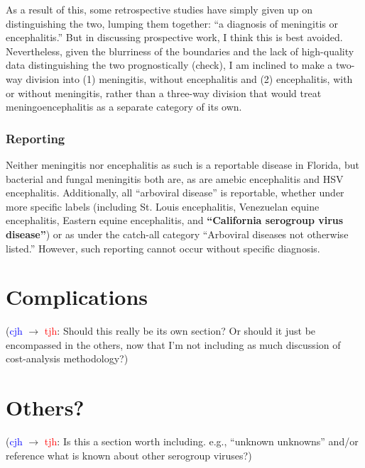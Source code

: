 \documentclass[12pt]{article}
\newcommand{\cjh}{\textcolor{blue}{cjh}}
\newcommand{\tjh}{\textcolor{red}{tjh}}
\newcommand{\msg}[3]{(#1 $\rightarrow$ #2: #3)}
\newcommand{\mct}[1]{\msg\cjh\tjh{#1}}
\begin{document}
            As a result of this, some retrospective studies have simply given up on distinguishing the two, lumping them together: ``a diagnosis of meningitis or encephalitis.'' But in discussing prospective work, I think this is best avoided. Nevertheless, given the blurriness of the boundaries and the lack of high-quality data distinguishing the two prognostically (check), I am inclined to make a two-way division into (1) meningitis, without encephalitis and (2) encephalitis, with or without meningitis, rather than a three-way division that would treat meningoencephalitis as a separate category of its own.
        
        \subsubsection{Reporting}
            \label{reporting}
            Neither meningitis nor encephalitis as such is a reportable disease in Florida, but bacterial and fungal meningitis both are, as are amebic encephalitis and HSV encephalitis. Additionally, all ``arboviral disease'' is reportable, whether under more specific labels (including St. Louis encephalitis, Venezuelan equine encephalitis, Eastern equine encephalitis, and \textbf{``California serogroup virus disease''}) or as under the catch-all category ``Arboviral diseases not otherwise listed.'' However, such reporting cannot occur without specific diagnosis.

        \section{Complications}
            \mct{Should this really be its own section? Or should it just be encompassed in the others, now that I'm not including as much discussion of cost-analysis methodology?}

        \section{Others?}
            \mct{Is this a section worth including. e.g., ``unknown unknowns'' and/or reference what is known about other serogroup viruses?}
\end{document}

